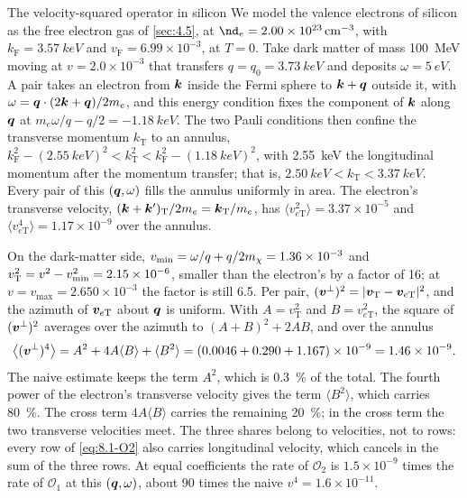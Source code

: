 \begin{workedexample}{The velocity-squared operator in silicon}\label{we:8-O2}
We model the valence electrons of silicon as the free electron gas of \cref{sec:4.5}, at $\nd_e = \SI{2.00e23}{cm^{-3}}$, with $k_{\mathrm{F}} = \SI{3.57}{keV}$ and $v_{\mathrm{F}} = 6.99\times10^{-3}$, at $T = 0$. Take dark matter of mass \SI{100}{MeV} moving at $v = 2.0\times10^{-3}$ that transfers $q = q_0 = \SI{3.73}{keV}$ and deposits $\omega = \SI{5}{eV}$. A pair takes an electron from $\bm{k}$ inside the Fermi sphere to $\bm{k} + \bm{q}$ outside it, with $\omega = \bm{q}\cdot(2\bm{k} + \bm{q})/2m_e$, and this energy condition fixes the component of $\bm{k}$ along $\bm{q}$ at $m_e\omega/q - q/2 = \SI{-1.18}{keV}$. The two Pauli conditions then confine the transverse momentum $k_{\mathrm{T}}$ to an annulus, $k_{\mathrm{F}}^2 - (\SI{2.55}{keV})^2 < k_{\mathrm{T}}^2 < k_{\mathrm{F}}^2 - (\SI{1.18}{keV})^2$, with \SI{2.55}{keV} the longitudinal momentum after the momentum transfer; that is, $\SI{2.50}{keV} < k_{\mathrm{T}} < \SI{3.37}{keV}$. Every pair of this $(\bm{q}, \omega)$ fills the annulus uniformly in area. The electron's transverse velocity, $(\bm{k} + \bm{k}')_{\mathrm{T}}/2m_e = \bm{k}_{\mathrm{T}}/m_e$, has $\langle v_{e\mathrm{T}}^2\rangle = 3.37\times10^{-5}$ and $\langle v_{e\mathrm{T}}^4\rangle = 1.17\times10^{-9}$ over the annulus.

On the dark-matter side, $v_{\mathrm{min}} = \omega/q + q/2m_{\chi} = 1.36\times10^{-3}$ and $v_{\mathrm{T}}^2 = v^2 - v_{\mathrm{min}}^2 = 2.15\times10^{-6}$, smaller than the electron's by a factor of 16; at $v = v_{\mathrm{max}} = 2.650\times10^{-3}$ the factor is still 6.5. Per pair, $(\bm{v}^\perp)^2 = |\bm{v}_{\mathrm{T}} - \bm{v}_{e\mathrm{T}}|^2$, and the azimuth of $\bm{v}_{e\mathrm{T}}$ about $\bm{q}$ is uniform. With $A = v_{\mathrm{T}}^2$ and $B = v_{e\mathrm{T}}^2$, the square of $(\bm{v}^\perp)^2$ averages over the azimuth to $(A + B)^2 + 2AB$, and over the annulus
\begin{equation*}
  \bigl\langle(\bm{v}^\perp)^4\bigr\rangle = A^2 + 4A\langle B\rangle + \langle B^2\rangle
  = (0.0046 + 0.290 + 1.167)\times10^{-9} = 1.46\times10^{-9} .
\end{equation*}
The naive estimate keeps the term $A^2$, which is \SI{0.3}{\percent} of the total. The fourth power of the electron's transverse velocity gives the term $\langle B^2\rangle$, which carries \SI{80}{\percent}. The cross term $4A\langle B\rangle$ carries the remaining \SI{20}{\percent}; in the cross term the two transverse velocities meet. The three shares belong to velocities, not to rows: every row of \cref{eq:8.1-O2} also carries longitudinal velocity, which cancels in the sum of the three rows. At equal coefficients the rate of $\mathcal{O}_2$ is $1.5\times10^{-9}$ times the rate of $\mathcal{O}_1$ at this $(\bm{q}, \omega)$, about 90 times the naive $v^4 = 1.6\times10^{-11}$.
\end{workedexample}

